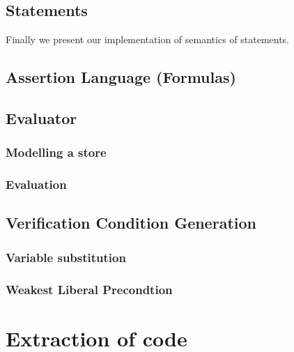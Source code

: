 \subsection{Statements}
Finally we present our implementation of semantics of statements.



\subsection{Assertion Language (Formulas)}\label{sec:iformulas}


\subsection{Evaluator}\label{sec:evaluator}


\subsubsection{Modelling a store}\label{sec:model}


\subsubsection{Evaluation}


\subsection{Verification Condition Generation}\label{sec:vcg}


\subsubsection{Variable substitution}


\subsubsection{Weakest Liberal Precondtion}\label{sec:impwlp}


\section{Extraction of code}\label{sec:extract}

